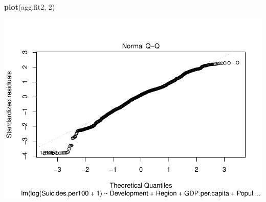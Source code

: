 \documentclass[11pt,]{article}
\newenvironment{Shaded}{\begin{snugshade}}{\end{snugshade}}
\newcommand{\DecValTok}[1]{\textcolor[rgb]{0.00,0.00,0.81}{#1}}
\newcommand{\KeywordTok}[1]{\textcolor[rgb]{0.13,0.29,0.53}{\textbf{#1}}}
\newcommand{\NormalTok}[1]{#1}
\begin{document}
\begin{Shaded}
\begin{Highlighting}[]
\KeywordTok{plot}\NormalTok{(agg.fit2, }\DecValTok{2}\NormalTok{)}
\end{Highlighting}
\end{Shaded}

\includegraphics{An-Analysis-of-Suicide-Data_files/figure-latex/unnamed-chunk-5-4.pdf}
\end{document}
